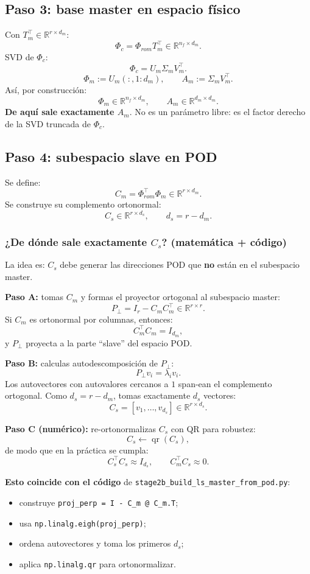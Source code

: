 \documentclass[11pt,a4paper]{article}
\begin{document}
\subsection{Paso 3: base master en espacio físico}
Con $T_m^\top\in\mathbb{R}^{r\times d_m}$:
\[
\Phi_c=\Phi_{rom}T_m^\top\in\mathbb{R}^{n_f\times d_m}.
\]
SVD de $\Phi_c$:
\[
\Phi_c = U_m\Sigma_m V_m^\top.
\]
\[
\Phi_m:=U_m(:,1{:}d_m),\qquad
A_m:=\Sigma_m V_m^\top.
\]
Así, por construcción:
\[
\Phi_m\in\mathbb{R}^{n_f\times d_m},\qquad
A_m\in\mathbb{R}^{d_m\times d_m}.
\]
\textbf{De aquí sale exactamente $A_m$}. No es un parámetro libre: es el factor derecho de la SVD truncada de $\Phi_c$.

\subsection{Paso 4: subespacio slave en POD}
Se define:
\[
C_m=\Phi_{rom}^\top\Phi_m\in\mathbb{R}^{r\times d_m}.
\]
Se construye su complemento ortonormal:
\[
C_s\in\mathbb{R}^{r\times d_s},\qquad d_s=r-d_m.
\]
\subsubsection*{¿De dónde sale exactamente \texorpdfstring{$C_s$}{Cs}? (matemática + código)}
La idea es: $C_s$ debe generar las direcciones POD que \textbf{no} están en el subespacio master.

\textbf{Paso A:} tomas $C_m$ y formas el proyector ortogonal al subespacio master:
\[
P_\perp = I_r - C_m C_m^\top \in \mathbb{R}^{r\times r}.
\]
Si $C_m$ es ortonormal por columnas, entonces:
\[
C_m^\top C_m = I_{d_m},
\]
y $P_\perp$ proyecta a la parte ``slave'' del espacio POD.

\textbf{Paso B:} calculas autodescomposición de $P_\perp$:
\[
P_\perp v_i = \lambda_i v_i.
\]
Los autovectores con autovalores cercanos a $1$ span-ean el complemento ortogonal.
Como $d_s=r-d_m$, tomas exactamente $d_s$ vectores:
\[
C_s = [v_1,\dots,v_{d_s}] \in \mathbb{R}^{r\times d_s}.
\]

\textbf{Paso C (numérico):} re-ortonormalizas $C_s$ con QR para robustez:
\[
C_s \leftarrow \operatorname{qr}(C_s),
\]
de modo que en la práctica se cumpla:
\[
C_s^\top C_s \approx I_{d_s},\qquad C_m^\top C_s \approx 0.
\]

\textbf{Esto coincide con el código} de \texttt{stage2b\_build\_ls\_master\_from\_pod.py}:
\begin{itemize}[leftmargin=1.5em]
\item construye \texttt{proj\_perp = I - C\_m @ C\_m.T};
\item usa \texttt{np.linalg.eigh(proj\_perp)};
\item ordena autovectores y toma los primeros $d_s$;
\item aplica \texttt{np.linalg.qr} para ortonormalizar.
\end{itemize}
\end{document}
